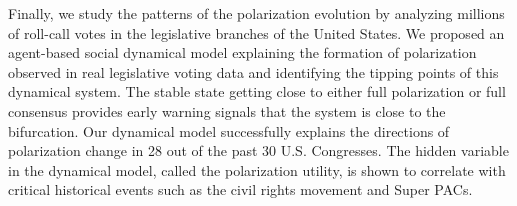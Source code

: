 Finally, we study the patterns of the polarization evolution by analyzing millions of roll-call votes in the legislative branches of the United States. We proposed an agent-based social dynamical model explaining the formation of polarization observed in real legislative voting data and identifying the tipping points of this dynamical system. The stable state getting close to either full polarization or full consensus provides early warning signals that the system is close to the bifurcation. Our dynamical model successfully explains the directions of polarization change in 28 out of the past 30 U.S. Congresses. The hidden variable in the dynamical model, called the polarization utility, is shown to correlate with critical historical events such as the civil rights movement and Super PACs.